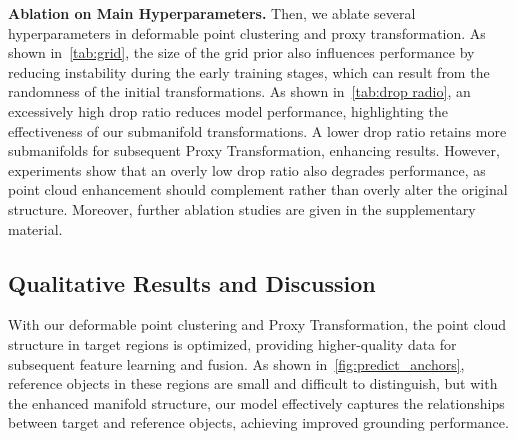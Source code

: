 \noindent \textbf{Ablation on Main Hyperparameters.} 
Then, we ablate several hyperparameters in deformable point clustering and proxy transformation. As shown in~\cref{tab:grid}, the size of the grid prior also influences performance by reducing instability during the early training stages, which can result from the randomness of the initial transformations.
As shown in~\cref{tab:drop radio}, an excessively high drop ratio reduces model performance, highlighting the effectiveness of our submanifold transformations. A lower drop ratio retains more submanifolds for subsequent Proxy Transformation, enhancing results. However, experiments show that an overly low drop ratio also degrades performance, as point cloud enhancement should complement rather than overly alter the original structure. Moreover, further ablation studies are given in the supplementary material.


\subsection{Qualitative Results and Discussion}
\label{sub:qualitative}
With our deformable point clustering and Proxy Transformation, the point cloud structure in target regions is optimized, providing higher-quality data for subsequent feature learning and fusion. As shown in~\cref{fig:predict_anchors}, reference objects in these regions are small and difficult to distinguish, but with the enhanced manifold structure, our model effectively captures the relationships between target and reference objects, achieving improved grounding performance. 